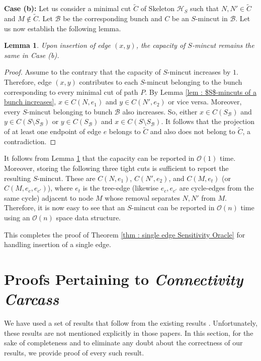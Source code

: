 \documentclass[letterpaper,11pt]{article}
\newtheorem{lemma}{Lemma}[]
\begin{document}
\noindent
\textbf{Case (b):} Let us consider a minimal cut $\tilde C$ of Skeleton ${\mathcal H}_S$ such that $N,N'\in \tilde C$ and $M\notin \tilde C$. Let ${\mathcal B}$ be the corresponding bunch and $C$ be an $S$-mincut in ${\mathcal B}$. Let us now establish the following lemma.
\begin{lemma} \label{lem : insertion of an edge}
    Upon insertion of edge $(x,y)$, the capacity of $S$-mincut remains the same in Case (b). 
\end{lemma}
\begin{proof}
    Assume to the contrary that the capacity of $S$-mincut increases by $1$. Therefore, edge $(x,y)$ contributes to each $S$-mincut belonging to the bunch corresponding to every minimal cut of path $P$. By Lemma \ref{lem : $S$-mincuts of a bunch increases}, $x\in C(N,e_1)$ and $y\in C(N',e_2)$ or vice versa. Moreover, every $S$-mincut belonging to bunch ${\mathcal B}$ also increases. So, either $x\in C(S_{\mathcal B})$ and $y\in C(S\setminus S_{\mathcal B})$ or $y\in C(S_{\mathcal B})$ and $x\in C(S\setminus S_{\mathcal B})$. It follows that the projection of at least one endpoint of edge $e$ belongs to $\tilde C$ and also does not belong to $\tilde C$, a contradiction.   
\end{proof}
It follows from Lemma \ref{lem : insertion of an edge} that the capacity can be reported in ${\mathcal O}(1)$ time. Moreover, storing the following three tight cuts is sufficient to report the resulting $S$-mincut. These are $C(N,e_1)$, $C(N',e_2)$, and $C(M,e_t)$ (or $C(M,e_c,e_{c'})$), where $e_t$ is the tree-edge (likewise $e_c,e_{c'}$ are cycle-edges from the same cycle) adjacent to node $M$ whose removal separates $N,N'$ from $M$. Therefore, it is now easy to see that an $S$-mincut can be reported in ${\mathcal O}(n)$ time using an ${\mathcal O}(n)$ space data structure.

This completes the proof of Theorem \ref{thm : single edge Sensitivity Oracle} for handling insertion of a single edge.


\section{Proofs Pertaining to \textit{Connectivity Carcass}}
We have used a set of results that follow from the existing results \cite{DBLP:conf/soda/BaswanaP22, DBLP:conf/stoc/DinitzV94, DBLP:conf/soda/DinitzV95, DBLP:journals/siamcomp/DinitzV00}. Unfortunately, these results are not mentioned explicitly in those papers. In this section, for the sake of completeness and to eliminate any doubt about the correctness of our results, we provide proof of every such result. 
\end{document}
